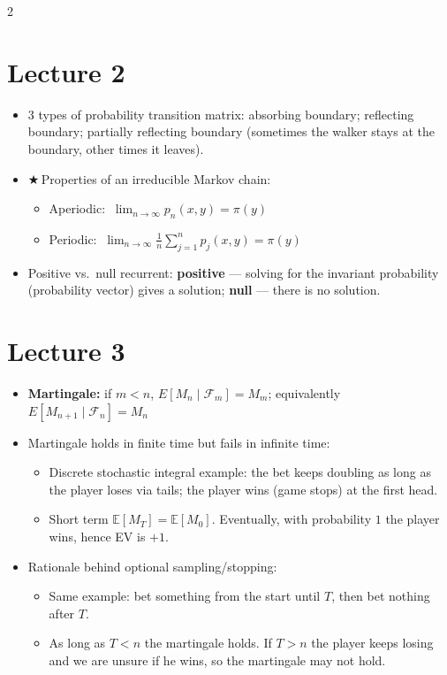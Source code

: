 \documentclass[8pt,letterpaper]{extarticle}
\newcommand{\cs}{{\color{red!75!black}$\bigstar$}\,} %
\begin{document}
\begin{multicols}{2}
\section{Lecture 2}
\begin{itemize}
  \item 3 types of probability transition matrix: absorbing boundary; reflecting boundary; partially reflecting boundary (sometimes the walker stays at the boundary, other times it leaves).
  \item \cs Properties of an irreducible Markov chain:
    \begin{itemize}
      \item Aperiodic: $\ \lim_{n\to\infty}p_n(x,y)=\pi(y)$
      \item Periodic: $\ \lim_{n\to\infty}\frac{1}{n}\sum_{j=1}^{n}p_j(x,y)=\pi(y)$
    \end{itemize}
  \item Positive vs.\ null recurrent: \textbf{positive} --- solving for the invariant probability (probability vector) gives a solution; \textbf{null} --- there is no solution.
\end{itemize}

\section{Lecture 3}
\begin{itemize}
  \item \textbf{Martingale:} if $m<n$, $E[M_n\mid\mathcal{F}_m]=M_m$; equivalently $E[M_{n+1}\mid\mathcal{F}_n]=M_n$
  \item Martingale holds in finite time but fails in infinite time:
    \begin{itemize}
      \item Discrete stochastic integral example: the bet keeps doubling as long as the player loses via tails; the player wins (game stops) at the first head.
      \item Short term $\mathbb{E}[M_T]=\mathbb{E}[M_0]$. Eventually, with probability $1$ the player wins, hence EV is $+1$.
    \end{itemize}
  \item Rationale behind optional sampling/stopping:
    \begin{itemize}
      \item Same example: bet something from the start until $T$, then bet nothing after $T$.
      \item As long as $T<n$ the martingale holds. If $T>n$ the player keeps losing and we are unsure if he wins, so the martingale may not hold.
    \end{itemize}
\end{itemize}


\end{multicols}
\end{document}
